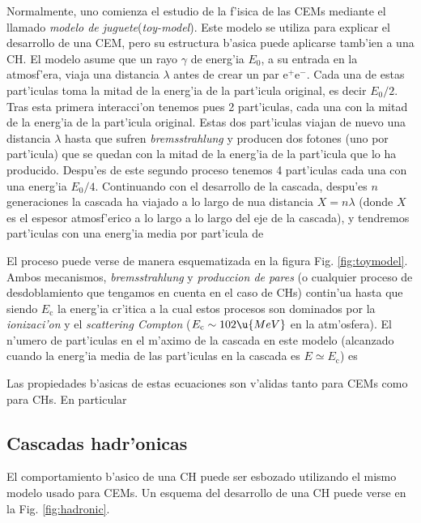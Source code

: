 Normalmente, uno comienza el estudio de la f'isica de las CEMs
mediante el llamado \emph{modelo de juguete}(\emph{toy-model}). Este
modelo se utiliza para explicar el desarrollo de una CEM, pero su
estructura b'asica puede aplicarse tamb'ien a una CH. El modelo asume
que un rayo $\gamma$ de energ'ia $E_0$, a su entrada en la atmosf'era,
viaja una distancia $\lambda$ antes de crear un par e$^+$e$^-$. Cada
una de estas part'iculas toma la mitad de la energ'ia de la part'icula
original, es decir $E_0/2$. Tras esta primera interacci'on tenemos
pues 2 part'iculas, cada una con la mitad de la energ'ia de la
part'icula original. Estas dos part'iculas viajan de nuevo una
distancia $\lambda$ hasta que sufren \emph{bremsstrahlung} y producen
dos fotones (uno por part'icula) que se quedan con la mitad de la
energ'ia de la part'icula que lo ha producido. Despu'es de este
segundo proceso tenemos 4 part'iculas cada una con una energ'ia
$E_0/4$. Continuando con el desarrollo de la cascada, despu'es $n$
generaciones la cascada ha viajado a lo largo de nua distancia
$X=n\lambda$ (donde $X$ es el espesor atmosf'erico a lo largo a lo
largo del eje de la cascada), y tendremos
%
\toyAeq
%
part'iculas con una energ'ia media por part'icula de
%
\toyBeq

El proceso puede verse de manera esquematizada en la figura  Fig.
\ref{fig:toymodel}.  Ambos mecanismos, \emph{bremsstrahlung} y
\emph{produccion de pares} (o cualquier proceso de desdoblamiento que
tengamos en cuenta en el caso de CHs) contin'ua hasta que
%
\toyCeq
%
siendo $E_{\mathrm{c}}$ la energ'ia cr'itica a la cual estos procesos
son dominados por la \emph{ionizaci'on} y el \emph{scattering Compton}
($E_{\mathrm{c}} \sim 102\u{MeV}$ en la atm'osfera). El n'umero de
part'iculas en el m'aximo de la cascada en este modelo (alcanzado
cuando la energ'ia media de las part'iculas en la cascada es $E\simeq
E_{\mathrm{c}}$) es
%
\toyDeq

\hadronicfig

Las propiedades b'asicas de estas ecuaciones son v'alidas tanto para
CEMs como para CHs. En particular
%
\NXsimpleeq

\subsection{Cascadas hadr'onicas}

El comportamiento b'asico de una CH puede ser esbozado utilizando el
mismo modelo usado para CEMs. Un esquema del desarrollo de una CH
puede verse en la Fig. \ref{fig:hadronic}.

